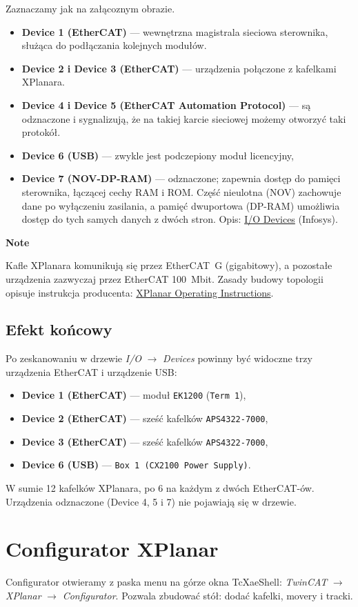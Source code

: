 \documentclass[11pt,a4paper]{report}
\newcommand{\podrozdzial}[1]{\subsection*{#1}\addcontentsline{toc}{subsection}{#1}}
\newcommand{\uwaga}[1]{%
  \begin{tcolorbox}[beckbox,colback=bknote,borderline west={3pt}{0pt}{bkblue}]
  \textbf{\color{bkblue}Note}\par #1
  \end{tcolorbox}}
\begin{document}
Zaznaczamy jak na załącoznym obrazie.
\begin{itemize}
  \item \textbf{Device 1 (EtherCAT)} --- wewnętrzna magistrala sieciowa sterownika, służąca do podłączania kolejnych modułów.
  \item \textbf{Device 2 i Device 3 (EtherCAT)} --- urządzenia połączone z kafelkami XPlanara.
  \item \textbf{Device 4 i Device 5 (EtherCAT Automation Protocol)} --- są odznaczone i sygnalizują, że na takiej karcie sieciowej możemy otworzyć taki protokół.
  \item \textbf{Device 6 (USB)} --- zwykle jest podczepiony moduł licencyjny,
  \item \textbf{Device 7 (NOV-DP-RAM)} --- odznaczone; zapewnia dostęp do pamięci sterownika, łączącej cechy RAM i ROM. Część nieulotna (NOV) zachowuje dane po wyłączeniu zasilania, a pamięć dwuportowa (DP-RAM) umożliwia dostęp do tych samych danych z dwóch stron. Opis: \href{https://infosys.beckhoff.com/content/1033/tcsystemmanager/1087918987.html}{I/O Devices} (Infosys).
\end{itemize}

\uwaga{Kafle XPlanara komunikują się przez EtherCAT~G (gigabitowy), a pozostałe urządzenia zazwyczaj przez EtherCAT 100~Mbit. Zasady budowy topologii opisuje instrukcja producenta: \href{https://download.beckhoff.com/download/document/motion/xplanar_ba_en.pdf}{XPlanar Operating Instructions}.}

\podrozdzial{Efekt końcowy}
Po zeskanowaniu w drzewie \textit{I/O} $\rightarrow$ \textit{Devices} powinny być widoczne trzy urządzenia EtherCAT i urządzenie USB:
\begin{itemize}
  \item \textbf{Device 1 (EtherCAT)} --- moduł \texttt{EK1200} (\texttt{Term 1}),
  \item \textbf{Device 2 (EtherCAT)} --- sześć kafelków \texttt{APS4322-7000},
  \item \textbf{Device 3 (EtherCAT)} --- sześć kafelków \texttt{APS4322-7000},
  \item \textbf{Device 6 (USB)} --- \texttt{Box 1 (CX2100 Power Supply)}.
\end{itemize}
W sumie 12 kafelków XPlanara, po 6 na każdym z dwóch EtherCAT-ów. Urządzenia odznaczone (Device 4, 5 i 7) nie pojawiają się w drzewie.

\section{Configurator XPlanar}
Configurator otwieramy z paska menu na górze okna TcXaeShell: \textit{TwinCAT} $\rightarrow$ \textit{XPlanar} $\rightarrow$ \textit{Configurator}. Pozwala zbudować stół: dodać kafelki, movery i tracki.
\end{document}

